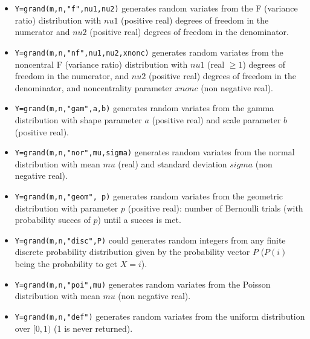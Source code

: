 \begin{description}
\begin{itemize}
\item {} 
  \verb!Y=grand(m,n,"f",nu1,nu2)! generates random variates from the F 
  (variance ratio) distribution with $nu1$ (positive real)
  degrees of freedom in the numerator and $nu2$ (positive real) 
  degrees of freedom in the denominator. 
  
\item {} 
  \verb!Y=grand(m,n,"nf",nu1,nu2,xnonc)! generates random variates from the noncentral 
  F (variance ratio)  distribution with $nu1$ (real $\ge 1$) degrees of freedom 
  in the numerator, and $nu2$ (positive real) degrees of freedom in the denominator, 
  and noncentrality parameter $xnonc$ (non negative real). 
  
\item {} \verb!Y=grand(m,n,"gam",a,b)! generates random variates from the gamma 
  distribution with shape parameter $a$ (positive real) and scale
  parameter $b$ (positive real).
  
\item {} 
  \verb!Y=grand(m,n,"nor",mu,sigma)! generates random variates from the normal 
  distribution with mean $mu$ (real)  and standard deviation $sigma$
  (non negative real). 
  
\item {} \verb!Y=grand(m,n,"geom", p)! generates random variates from the geometric
  distribution with parameter $p$ (positive real): number of Bernoulli trials (with 
  probability succes of $p$) until a succes is met.

\item {} 
  \verb!Y=grand(m,n,"disc",P)! could generates random integers from any
  finite discrete probability distribution given by the probability
  vector $P$ ($P(i)$ being the probability to get $X=i$).

\item {} \verb!Y=grand(m,n,"poi",mu)! generates random variates from the Poisson 
  distribution with mean $mu$ (non negative real).

\item {} \verb!Y=grand(m,n,"def")! generates random variates from the uniform 
  distribution over $[0,1)$ (1 is never returned).


\end{itemize}
\end{description}
